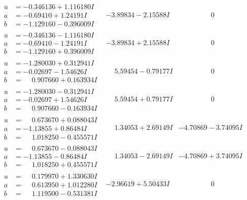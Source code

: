\documentclass[1p]{elsarticle_modified}
\theoremstyle{definition}
\begin{document}
$$\begin{array}{c|c|c}
\begin{aligned}
u &= -0.346136 + 1.116180 I \\
a &= -0.69410 + 1.24191 I \\
b &= -1.129160 - 0.396009 I\end{aligned}
 & -3.89834 - 2.15588 I & \phantom{-0.000000 } 0 \\ \hline\begin{aligned}
u &= -0.346136 - 1.116180 I \\
a &= -0.69410 - 1.24191 I \\
b &= -1.129160 + 0.396009 I\end{aligned}
 & -3.89834 + 2.15588 I & \phantom{-0.000000 } 0 \\ \hline\begin{aligned}
u &= -1.280030 + 0.312941 I \\
a &= -0.02697 - 1.54626 I \\
b &= \phantom{-}0.907660 + 0.163934 I\end{aligned}
 & \phantom{-}5.59454 - 0.79177 I & \phantom{-0.000000 } 0 \\ \hline\begin{aligned}
u &= -1.280030 - 0.312941 I \\
a &= -0.02697 + 1.54626 I \\
b &= \phantom{-}0.907660 - 0.163934 I\end{aligned}
 & \phantom{-}5.59454 + 0.79177 I & \phantom{-0.000000 } 0 \\ \hline\begin{aligned}
u &= \phantom{-}0.673670 + 0.088043 I \\
a &= -1.13855 + 0.86484 I \\
b &= \phantom{-}1.018250 - 0.455571 I\end{aligned}
 & \phantom{-}1.34053 + 2.69149 I & -4.70869 - 3.74095 I \\ \hline\begin{aligned}
u &= \phantom{-}0.673670 - 0.088043 I \\
a &= -1.13855 - 0.86484 I \\
b &= \phantom{-}1.018250 + 0.455571 I\end{aligned}
 & \phantom{-}1.34053 - 2.69149 I & -4.70869 + 3.74095 I \\ \hline\begin{aligned}
u &= \phantom{-}0.179970 + 1.330630 I \\
a &= \phantom{-}0.613950 + 1.012280 I \\
b &= \phantom{-}1.119500 - 0.531381 I\end{aligned}
 & -2.96619 + 5.50433 I & \phantom{-0.000000 } 0 \\ \hline\begin{aligned}

\end{aligned}
\end{array}$$
\end{document}
